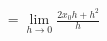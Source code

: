 \documentclass[preview]{standalone}
\begin{document}
\begin{align*}
= \lim_{h\to 0} \frac{2x_0 h + h^2}{h}
\end{align*}
\end{document}

